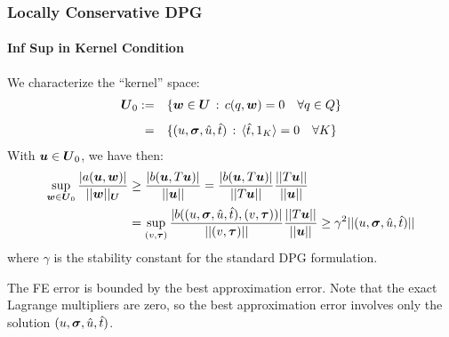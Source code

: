 \documentclass[18pt,xcolor=table]{beamer}
\begin{document}
\begin{frame}
\frametitle{Locally Conservative DPG}
\framesubtitle{Inf Sup in Kernel Condition}
We characterize the ``kernel'' space:
\begin{equation*}
\begin{array}
{rl}
\boldsymbol U_0  := & \{ \boldsymbol w \in \boldsymbol U \, : \, c(q,\boldsymbol w) = 0 \quad \forall q \in Q\} \\[8pt]
 = &\{ (u,\boldsymbol\sigma,\hat{u},\hat{t}) \, : \, \langle \hat{t},1_K \rangle = 0
 \quad \forall K \}
\end{array}
\end{equation*}
With $\boldsymbol u \in \boldsymbol U_0$, we have then:
\begin{align*}
   \sup_{\boldsymbol w \in \boldsymbol U_0} \frac{| a(\boldsymbol u,\boldsymbol w) |}{|| \boldsymbol w ||_{\boldsymbol U} }
   &\geq \frac{| b(\boldsymbol u,T \boldsymbol u) |}{|| \boldsymbol u ||}
   = \frac{| b(\boldsymbol u,T \boldsymbol u) |}{|| T\boldsymbol u ||}\frac{||T\boldsymbol u||}{||\boldsymbol u||}\\
   &= \sup_{(v,\boldsymbol\tau)}\frac{| b((u,\boldsymbol\sigma,\hat{u},\hat{t}), (v,\boldsymbol\tau)) |}{|| (v,\boldsymbol\tau) ||}
   \frac{||T\boldsymbol u||}{||\boldsymbol u||}
   \geq \gamma^2 || (u,\boldsymbol\sigma,\hat{u},\hat{t}) ||
\end{align*}
where $\gamma$ is the stability constant for the standard DPG formulation.

The FE error is bounded by the best approximation error. Note that the exact
Lagrange multipliers are zero, so the best approximation error involves only
the solution $(u,\boldsymbol\sigma,\hat{u},\hat{t})$.
\end{frame}

\end{document}
